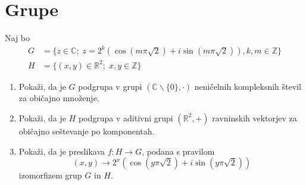 \documentclass[a4paper,12pt]{article}
\begin{document}
\section*{Grupe}

Naj bo
\begin{align*}
   G &=\{z \in \mathbb{C};\; z=2^k (\cos(m\pi \sqrt{2})+i\sin(m\pi \sqrt{2})),k,m \in \mathbb{Z}\} \\
   H &=\{(x,y) \in \mathbb{R}^2;\; x,y \in \mathbb{Z}\}
\end{align*}

\begin{enumerate}
\item
Pokaži, da je \(G\) podgrupa v grupi \((\mathbb{C}\backslash \{0\},\cdot)\)
neničelnih kompleksnih števil za običajno množenje.

\item
Pokaži, da je \(H\) podgrupa v aditivni grupi \((\mathbb{R}^2,+)\)
ravninskih vektorjev za običajno seštevanje po komponentah.

\item
Pokaži, da je preslikava \(f:H\to G\), podana s pravilom
\[
(x,y) \to 2^x (\cos(y\pi \sqrt{2})+i\sin(y\pi \sqrt{2}))
\]
izomorfizem grup \(G\) in \(H\).
\end{enumerate}
\end{document}
